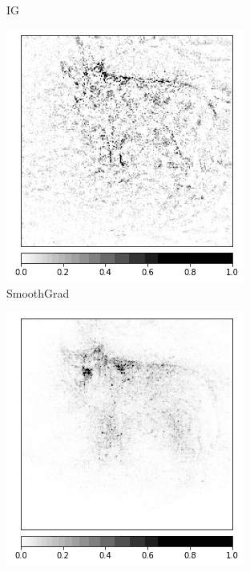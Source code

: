 \begin{figure}[h]
\begin{subfigure}{.19\textwidth}
    \caption{IG}\label{fig:noisetunnel-ig-dingo}
\end{subfigure}
 \begin{subfigure}{.19\textwidth}
    \centering
    \includegraphics[width=\textwidth]{methods/images/ig-smoothgrad-dingo.png}
    \caption{SmoothGrad}\label{fig:noisetunnel-smoothgrad-dingo}
\end{subfigure}
 \begin{subfigure}{.19\textwidth}
    \centering
    \includegraphics[width=\textwidth]{methods/images/ig-smoothgrad-sq-dingo.png}

\end{subfigure}
\end{figure}
